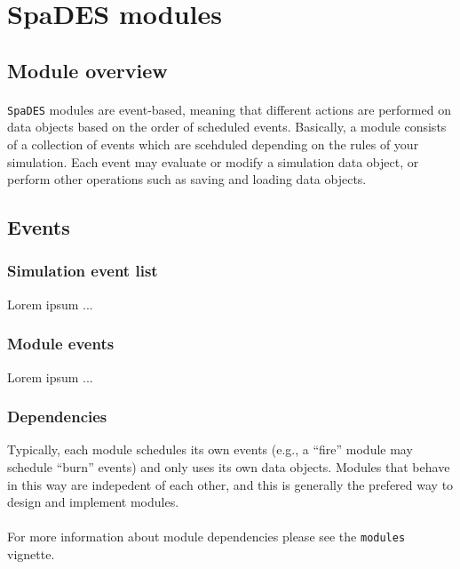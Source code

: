 \documentclass{article}
\begin{document}
\newpage

\section{SpaDES modules}

\subsection{Module overview}

\paragraph{}
\texttt{SpaDES} modules are event-based, meaning that different actions are performed on data objects based on the order of scheduled events. Basically, a module consists of a collection of events which are scehduled depending on the rules of your simulation. Each event may evaluate or modify a simulation data object, or perform other operations such as saving and loading data objects.

\subsection{Events}

\subsubsection{Simulation event list}
Lorem ipsum ...

\subsubsection{Module events}
Lorem ipsum ...

\subsubsection{Dependencies}
Typically, each module schedules its own events (e.g., a ``fire'' module may schedule ``burn'' events) and only uses its own data objects. Modules that behave in this way are indepedent of each other, and this is generally the prefered way to design and implement modules.

\paragraph{}
For more information about module dependencies please see the \texttt{modules} vignette.
\end{document}
